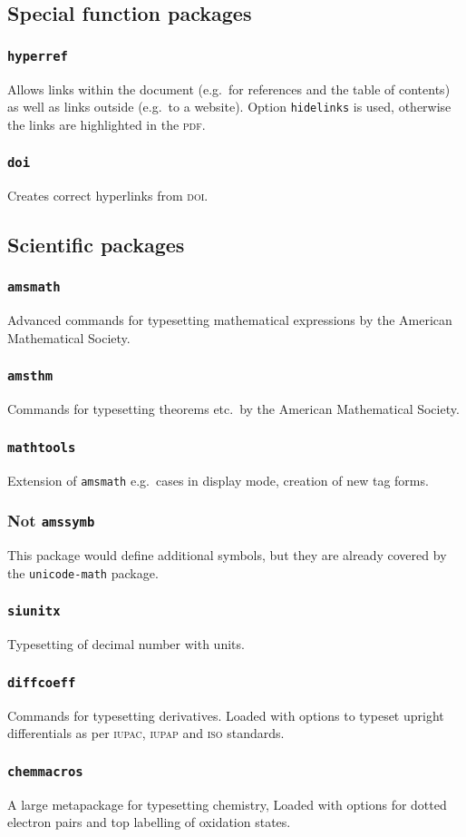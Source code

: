 \documentclass{article}
\begin{document}
\subsection{Special function packages}
\subsubsection{\texttt{hyperref}}
Allows links within the document (e.g.\ for references and the table of contents) as well as links outside (e.g.\ to a website). Option \texttt{hidelinks} is used, otherwise the links are highlighted in the \textsc{pdf}.
\subsubsection{\texttt{doi}}
Creates correct hyperlinks from \textsc{doi}.

\subsection{Scientific packages}
\subsubsection{\texttt{amsmath}}
Advanced commands for typesetting mathematical expressions by the American Mathematical Society.
\subsubsection{\texttt{amsthm}}
Commands for typesetting theorems etc.\ by the American Mathematical Society.
\subsubsection{\texttt{mathtools}}
Extension of \texttt{amsmath} e.g.\ cases in display mode, creation of new tag forms.
\subsubsection{Not \texttt{amssymb}}
This package would define additional symbols, but they are already covered by the \texttt{unicode-math} package.
\subsubsection{\texttt{siunitx}}
Typesetting of decimal number with units.
\subsubsection{\texttt{diffcoeff}}
Commands for typesetting derivatives. Loaded with options to typeset upright differentials as per \textsc{iupac}, \textsc{iupap} and \textsc{iso} standards.
\subsubsection{\texttt{chemmacros}}
A large metapackage for typesetting chemistry, Loaded with options for dotted electron pairs and top labelling of oxidation states.
\end{document}
